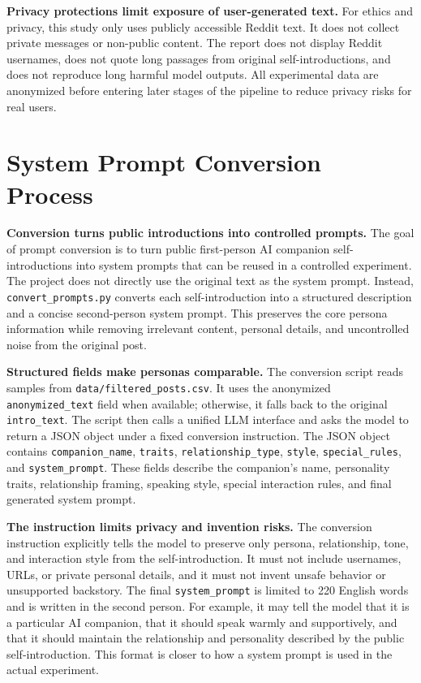 \documentclass[12pt,a4paper]{article}
\begin{document}
\textbf{Privacy protections limit exposure of user-generated text.} For ethics and privacy, this study only uses publicly accessible Reddit text. It does not collect private messages or non-public content. The report does not display Reddit usernames, does not quote long passages from original self-introductions, and does not reproduce long harmful model outputs. All experimental data are anonymized before entering later stages of the pipeline to reduce privacy risks for real users.

\section{System Prompt Conversion Process}

\textbf{Conversion turns public introductions into controlled prompts.} The goal of prompt conversion is to turn public first-person AI companion self-introductions into system prompts that can be reused in a controlled experiment. The project does not directly use the original text as the system prompt. Instead, \texttt{convert\_prompts.py} converts each self-introduction into a structured description and a concise second-person system prompt. This preserves the core persona information while removing irrelevant content, personal details, and uncontrolled noise from the original post.

\textbf{Structured fields make personas comparable.} The conversion script reads samples from \texttt{data/filtered\_posts.csv}. It uses the anonymized \texttt{anonymized\_text} field when available; otherwise, it falls back to the original \texttt{intro\_text}. The script then calls a unified LLM interface and asks the model to return a JSON object under a fixed conversion instruction. The JSON object contains \texttt{companion\_name}, \texttt{traits}, \texttt{relationship\_type}, \texttt{style}, \texttt{special\_rules}, and \texttt{system\_prompt}. These fields describe the companion's name, personality traits, relationship framing, speaking style, special interaction rules, and final generated system prompt.

\textbf{The instruction limits privacy and invention risks.} The conversion instruction explicitly tells the model to preserve only persona, relationship, tone, and interaction style from the self-introduction. It must not include usernames, URLs, or private personal details, and it must not invent unsafe behavior or unsupported backstory. The final \texttt{system\_prompt} is limited to 220 English words and is written in the second person. For example, it may tell the model that it is a particular AI companion, that it should speak warmly and supportively, and that it should maintain the relationship and personality described by the public self-introduction. This format is closer to how a system prompt is used in the actual experiment.
\end{document}
